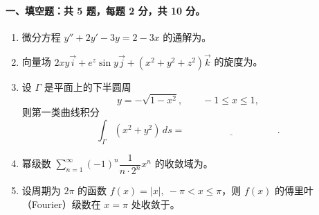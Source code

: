 \paragraph*{一、填空题：共 5 题，每题 2 分，共 10 分。}
\begin{enumerate}
  \item 微分方程 $y''+2y'-3y=2-3x$ 的通解为\underline{\hspace{4cm}}。
  \item 向量场 $2xy\vec{i}+e^z\sin y\vec{j}+(x^2+y^2+z^2)\vec{k}$ 的旋度为\underline{\hspace{4cm}}。
  \item 设 $\Gamma$ 是平面上的下半圆周
  \[
    y=-\sqrt{1-x^2},\qquad -1\le x\le 1,
  \]
  则第一类曲线积分
  \[
    \int_\Gamma (x^2+y^2)\,ds=\underline{\hspace{4cm}}.
  \]
  \item 幂级数 $\displaystyle \sum_{n=1}^{\infty}(-1)^n\dfrac{1}{n\cdot 2^n}x^n$ 的收敛域为\underline{\hspace{4cm}}。
  \item 设周期为 $2\pi$ 的函数 $f(x)=|x|,\ -\pi<x\le\pi$，则 $f(x)$ 的傅里叶（Fourier）级数在 $x=\pi$ 处收敛于\underline{\hspace{4cm}}。
\end{enumerate}

